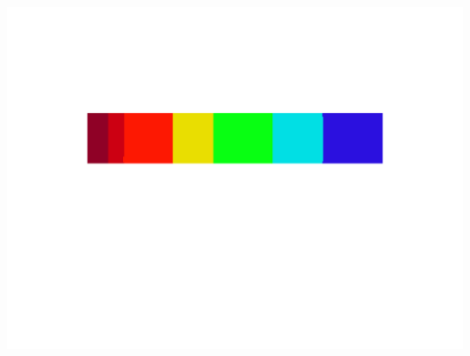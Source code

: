 \documentclass[fleqn]{article}
\begin{document}
\includegraphics[scale=0.4]{./pics/task1and2/spectrum_k=7_random2/K=7_iteration_19_random_7_spectrum.png}\\ 
\end{document}
